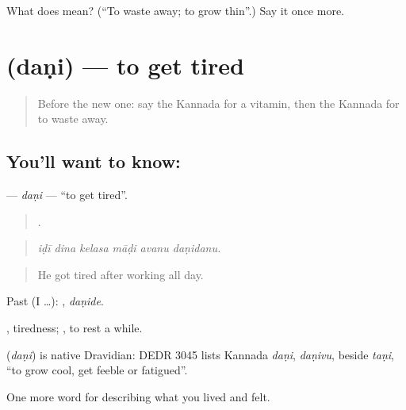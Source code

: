 \begin{tcolorbox}[breakable,colback=teal!4,colframe=teal!35!black,title={Before you move on}]
What does  mean? (\textquotedblleft{}To waste away; to grow thin\textquotedblright{}.) Say it once more.
\end{tcolorbox}
\section[\texorpdfstring{\kn{ದಣಿ} (daṇi)}{ದಣಿ (daṇi)}]{ (daṇi) — to get tired}

\label{lesson:KA-C514-dani}



\begin{quote}
Before the new one: say the Kannada for a vitamin, then the Kannada for to waste away.
\end{quote}

\subsection*{You'll want to know: }
\textbf{} — \emph{daṇi} — \textquotedblleft{}to get tired\textquotedblright{}.

\begin{quote}
     .
\end{quote}

\begin{quote}
\emph{iḍī dina kelasa māḍi avanu daṇidanu.}
\end{quote}

\begin{quote}
He got tired after working all day.
\end{quote}

Past (I …): , \emph{daṇide}.

, tiredness; , to rest a while.

\begin{cousinweb}
\textbf{} (\emph{daṇi}) is native Dravidian: DEDR 3045 lists Kannada \emph{daṇi}, \emph{daṇivu}, beside \emph{taṇi}, \textquotedblleft{}to grow cool, get feeble or fatigued\textquotedblright{}.
\end{cousinweb}

\begin{grammarlens}[title={What you've built}]
One more word for describing what you lived and felt.
\end{grammarlens}

